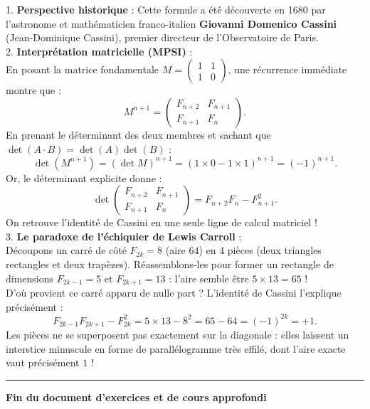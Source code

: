 \documentclass[11pt,a4paper]{article}
\begin{document}
\begin{remarquabox}
1. \textbf{Perspective historique} : Cette formule a été découverte en 1680 par l'astronome et mathématicien franco-italien \textbf{Giovanni Domenico Cassini} (Jean-Dominique Cassini), premier directeur de l'Observatoire de Paris.\\
2. \textbf{Interprétation matricielle (MPSI)} :\\
En posant la matrice fondamentale $M = \begin{pmatrix} 1 & 1 \\ 1 & 0 \end{pmatrix}$, une récurrence immédiate montre que :
\[
M^{n+1} = \begin{pmatrix} F_{n+2} & F_{n+1} \\ F_{n+1} & F_n \end{pmatrix}.
\]
En prenant le déterminant des deux membres et sachant que $\det(A \cdot B) = \det(A) \det(B)$ :
\[
\det(M^{n+1}) = (\det M)^{n+1} = (1 \times 0 - 1 \times 1)^{n+1} = (-1)^{n+1}.
\]
Or, le déterminant explicite donne :
\[
\det \begin{pmatrix} F_{n+2} & F_{n+1} \\ F_{n+1} & F_n \end{pmatrix} = F_{n+2} F_n - F_{n+1}^2.
\]
On retrouve l'identité de Cassini en une seule ligne de calcul matriciel !\\
3. \textbf{Le paradoxe de l'échiquier de Lewis Carroll} :\\
Découpons un carré de côté $F_{2k} = 8$ (aire $64$) en 4 pièces (deux triangles rectangles et deux trapèzes). Réassemblons-les pour former un rectangle de dimensions $F_{2k-1} = 5$ et $F_{2k+1} = 13$ : l'aire semble être $5 \times 13 = 65$ !\\
D'où provient ce carré apparu de nulle part ? L'identité de Cassini l'explique précisément :
\[
F_{2k-1} F_{2k+1} - F_{2k}^2 = 5 \times 13 - 8^2 = 65 - 64 = (-1)^{2k} = +1.
\]
Les pièces ne se superposent pas exactement sur la diagonale : elles laissent un interstice minuscule en forme de parallélogramme très effilé, dont l'aire exacte vaut précisément $1$ !
\end{remarquabox}

\vspace{1cm}
\hrule
\vspace{1cm}
\begin{center}
\textbf{\Large Fin du document d'exercices et de cours approfondi}
\end{center}
\end{document}
